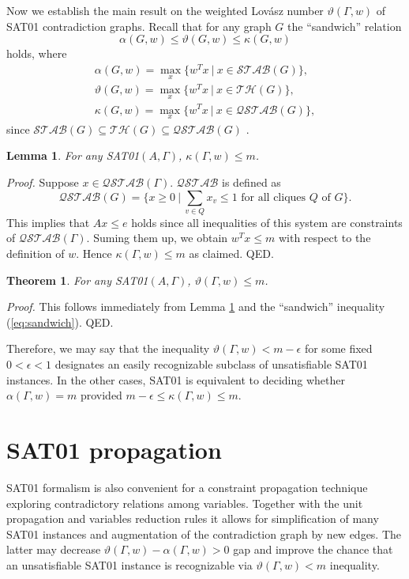 \documentclass[11pt]{article}
\newtheorem{thm}{Theorem}
\newtheorem{lem}{Lemma}
\begin{document}
Now we establish the main result on the weighted Lov\'asz number $\vartheta(\Gamma,w)$ of SAT01 contradiction graphs. Recall that for any graph $G$ the ``sandwich'' relation
\begin{equation}
\label{eq:sandwich}
\alpha(G,w) \le \vartheta(G,w) \le \kappa(G,w)
\end{equation}
holds, where
\[ \begin{array}{l}
\alpha(G,w) = \displaystyle\max_x \{w^T x \ | \ x \in \mathcal{STAB}(G)\}, \\
\vartheta(G,w) = \displaystyle\max_x \{w^T x \ | \ x \in \mathcal{TH}(G)\}, \\
\kappa(G,w) = \displaystyle\max_x \{w^T x \ | \ x \in \mathcal{QSTAB}(G)\},
\end{array} \]
since $\mathcal{STAB}(G) \subseteq \mathcal{TH}(G) \subseteq \mathcal{QSTAB}(G)$ \cite{L79,K94}.
\begin{lem}
\label{lem:sat01kappa}
For any SAT01$(A,\Gamma)$, $\kappa(\Gamma,w) \le m$.
\end{lem}

{\em Proof.\/} Suppose $x \in \mathcal{QSTAB}(\Gamma)$. $\mathcal{QSTAB}$ is defined as
\[ \mathcal{QSTAB}(G) = \{x \ge 0 \ | \ \sum_{v \in Q} x_v \le 1 \textrm{ for all cliques } Q \textrm{ of } G\}. \]
This implies that $Ax \le e$ holds since all inequalities of this system are constraints of $\mathcal{QSTAB}(\Gamma)$. Suming them up, we obtain $w^T x \le m$ with respect to the definition of $w$. Hence $\kappa(\Gamma,w) \le m$ as claimed. QED.

\begin{thm}
\label{thm:sat01theta}
For any SAT01$(A,\Gamma)$, $\vartheta(\Gamma,w) \le m$.
\end{thm}

{\em Proof.\/} This follows immediately from Lemma \ref{lem:sat01kappa} and the ``sandwich'' inequality (\ref{eq:sandwich}). QED.

\vspace{1pc}

Therefore, we may say that the inequality $\vartheta(\Gamma,w)<m-\epsilon$ for some fixed $0<\epsilon<1$ designates an easily recognizable subclass of unsatisfiable SAT01 instances. In the other cases, SAT01 is equivalent to deciding whether $\alpha(\Gamma,w)=m$ provided $m-\epsilon \le \kappa(\Gamma,w) \le m$.

\section{SAT01 propagation}
SAT01 formalism is also convenient for a constraint propagation technique exploring contradictory relations among variables. Together with the unit propagation and variables reduction rules it allows for simplification of many SAT01 instances and augmentation of the contradiction graph by new edges. The latter may decrease $\vartheta(\Gamma,w)-\alpha(\Gamma,w)>0$ gap and improve the chance that an unsatisfiable SAT01 instance is recognizable via $\vartheta(\Gamma,w)<m$ inequality.
\end{document}
